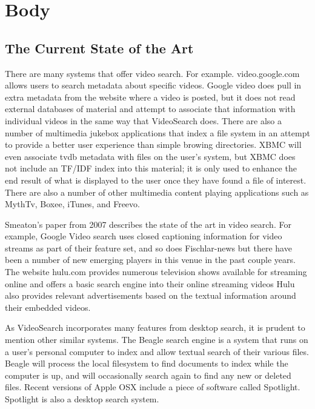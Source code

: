 \documentclass{acm_proc_article-sp}
\begin{document}
\section{Body}
\subsection{The Current State of the Art}

    There are many systems that offer video search.  For example. video.google.com allows users to search metadata about specific videos.  Google video does pull in extra metadata from the website where a video is posted, but it does not read external databases of material and attempt to associate that information with individual videos in the same way that VideoSearch does.  There are also a number of multimedia jukebox applications that index a file system in an attempt to provide a better user experience than simple browing directories. XBMC will even associate tvdb metadata with files on the user’s system\cite{goodwin2010appliance}, but XBMC does not include an TF/IDF index into this material; it is only used to enhance the end result of what is displayed to the user once they have found a file of interest. There are also a number of other multimedia content playing applications such as MythTv, Boxee, iTunes, and Freevo.\cite{schopman2010notube}

    Smeaton’s paper from 2007 describes the state of the art in video search. \cite{smeaton2007techniques} For example, Google Video search uses closed captioning information for video streams as part of their feature set, and so does Fischlar-news \cite{lee2006user} but there have been a number of new emerging players in this venue in the past couple years.  The website hulu.com provides numerous television shows available for streaming online and offers a basic search engine into their online streaming videos \cite{patent:20100287474} Hulu also provides relevant advertisements based on the textual information around their embedded videos.

    As VideoSearch incorporates many features from desktop search, it is prudent to mention other similar systems.  The Beagle search engine is a system that runs on a user’s personal computer to index and allow textual search of their various files.  \cite{brunkhorst2006beagle++}  Beagle will process the local filesystem to find documents to index while the computer is up, and will occasionally search again to find any new or deleted files.  Recent versions of Apple OSX include a piece of software called Spotlight.\cite{applex} Spotlight is also a desktop search system.
\end{document}
